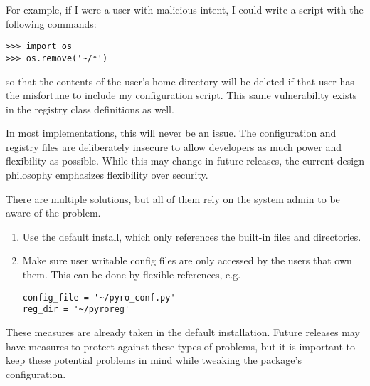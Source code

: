 For example, if I were a user with malicious intent, I could write a script with the following commands:
\begin{verbatim}
>>> import os
>>> os.remove('~/*')
\end{verbatim}
so that the contents of the user's home directory will be deleted if that user has the misfortune to include my configuration script.  This same vulnerability exists in the registry class definitions as well.  

In most implementations, this will never be an issue.    The configuration and registry files are deliberately insecure to allow developers as much power and flexibility as possible.  While this may change in future releases, the current design philosophy emphasizes flexibility over security.

There are multiple solutions, but all of them rely on the system admin to be aware of the problem.
\begin{enumerate}
\item Use the default install, which only references the built-in files and directories.
\item Make sure user writable config files are only accessed by the users that own them.  This can be done by flexible references, e.g.
\begin{verbatim}
config_file = '~/pyro_conf.py'
reg_dir = '~/pyroreg'
\end{verbatim}
\end{enumerate}

These measures are already taken in the default installation.  Future releases may have measures to protect against these types of problems, but it is important to keep these potential problems in mind while tweaking the package's configuration.
